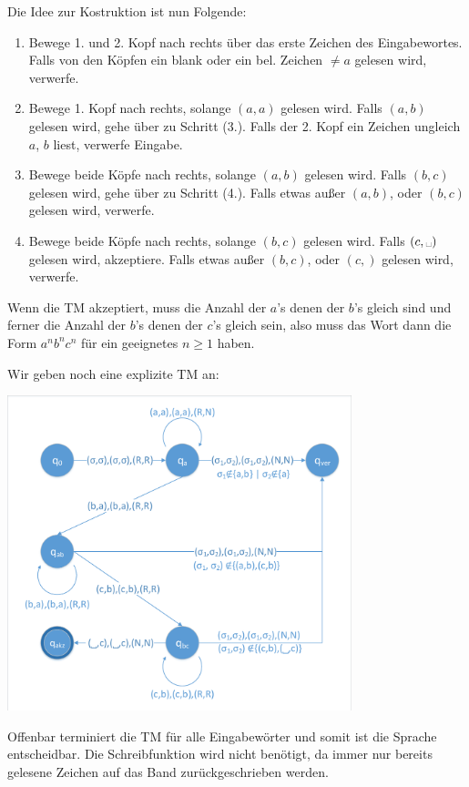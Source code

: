 \documentclass{article}
\begin{document}
\begin{enumerate}[a)]
	Die Idee zur Kostruktion ist nun Folgende:
	\begin{enumerate}[(1.)]
		\item Bewege 1. und 2. Kopf nach rechts über das erste Zeichen des Eingabewortes. Falls von den Köpfen ein blank oder ein bel. Zeichen $\neq a$ gelesen wird, verwerfe.
		\item Bewege 1. Kopf nach rechts, solange $(a,a)$ gelesen wird. Falls $(a,b)$ gelesen wird, gehe über zu Schritt (3.). Falls der 2. Kopf ein Zeichen ungleich $a$, $b$ liest, verwerfe Eingabe.
		\item Bewege beide Köpfe nach rechts, solange $(a,b)$ gelesen wird. Falls $(b,c)$ gelesen wird, gehe über zu Schritt (4.). Falls etwas außer $(a,b)$, oder $(b,c)$ gelesen wird, verwerfe.
		\item Bewege beide Köpfe nach rechts, solange $(b,c)$ gelesen wird. Falls $(c,\text{\textvisiblespace})$ gelesen wird, akzeptiere. Falls etwas außer $(b,c)$, oder $(c,)$ gelesen wird, verwerfe.
	\end{enumerate}
	Wenn die TM akzeptiert, muss die Anzahl der $a$'s denen der $b$'s gleich sind und ferner die Anzahl der $b$'s denen der $c$'s gleich sein, also muss das Wort dann die Form $a^n b^n c^n$ für ein geeignetes $n \ge 1$ haben.
	
	Wir geben noch eine explizite TM an:
	
	\begin{minipage}{\textwidth}
		\centering 	\includegraphics[width=0.75\textwidth,page=1,trim={2 2 2 4},clip]{diagramme.pdf}
	\end{minipage}
	
	Offenbar terminiert die TM für alle Eingabewörter und somit ist die Sprache entscheidbar. Die Schreibfunktion wird nicht benötigt, da immer nur bereits gelesene Zeichen auf das Band zurückgeschrieben werden.
	
\end{enumerate}
\end{document}
